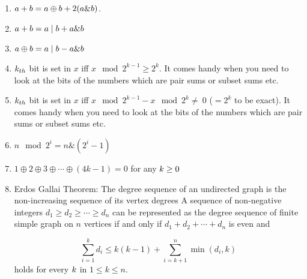 \begin{enumerate}

            \item $\displaystyle \displaystyle a+b = a \oplus b +2(a \& b)$.
            \item $\displaystyle \displaystyle a + b = a \mid b + a \& b$
            \item $\displaystyle \displaystyle a \oplus b = a\mid b - a \& b$
            \item $\displaystyle \displaystyle k_{th}$ bit is set in $\displaystyle x$ iff $\displaystyle x \mod 2^{k -
                1}\geq
                2^k$. It comes handy when you need to look at the bits of the numbers which are pair sums or subset sums
                etc.
            
            \item $\displaystyle \displaystyle k_{th}$ bit is set in $\displaystyle x$ iff $\displaystyle x \mod 2^{k - 1}
                - x
                \mod 2^k \neq\ 0$ ($ = 2^k$ to be exact). It comes handy when you need to look at the bits of the
                numbers
                which
                are pair sums or subset sums etc.
            \item $n \mod 2^i = n \& (2^i - 1)$
            \item $\displaystyle 1\oplus 2 \oplus 3 \oplus \cdots \oplus (4k - 1) = 0$ for any $\displaystyle
                \displaystyle k
                \ge
                0$
            \item 
                Erdos Gallai Theorem:
                    The degree sequence of an undirected graph is the non-increasing sequence of its vertex
                    degrees
                    A sequence of non-negative integers $d_1 \geq d_2 \geq \cdots \geq d_n$ can be represented as the
                    degree
                    sequence of finite simple graph on $n$ vertices if and only if $d_1 + d_2 + \cdots + d_n$ is even
                    and
                

                \[\displaystyle \sum_{i = 1}^k {d_i \leq k(k - 1)} + \sum_{i = k + 1}^n \min(d_i, k)\]
                holds for every $\displaystyle \displaystyle k$ in $\displaystyle 1 \leq k \leq n$.

            
        \end{enumerate}
